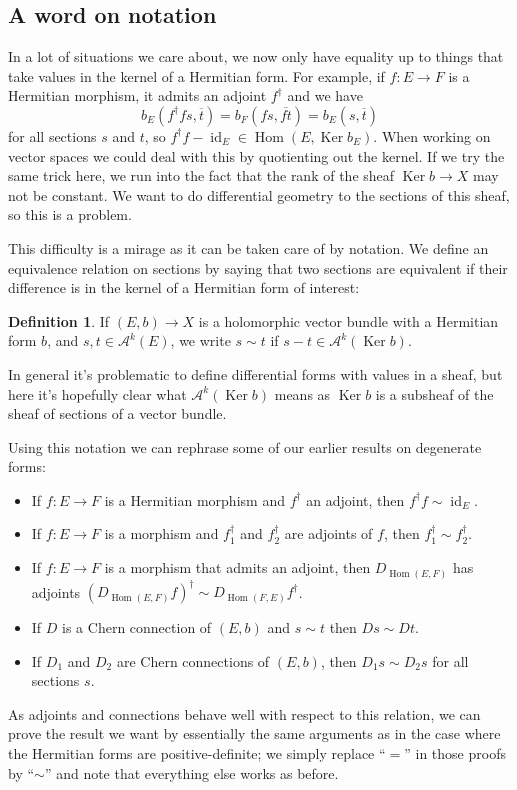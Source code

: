 \documentclass[10pt,a4paper]{amsart}
\theoremstyle{definition}
\newtheorem{defi}[theo]{Definition}
\newcommand{\cc}[1]{\mathcal{#1}}
\def\ov#1{\overline{#1}}
\DeclareMathOperator{\Ker}{Ker}
\DeclareMathOperator{\Hom}{Hom}
\DeclareMathOperator{\id}{id}
\begin{document}
\subsection*{A word on notation}


In a lot of situations we care about, we now only have equality up to things that take values in the kernel of a Hermitian form. For example, if $f : E \to F$ is a Hermitian morphism, it admits an adjoint $f^\dagger$ and we have
\[
b_E(f^\dagger f s, \ov t)
= b_F(f s, \ov{f t})
= b_E(s, \ov t)
\]
for all sections $s$ and $t$,
so $f^\dagger f - \id_E \in \Hom(E, \Ker b_E)$. When working on vector spaces we could deal with this by quotienting out the kernel. If we try the same trick here, we run into the fact that the rank of the sheaf $\Ker b \to X$ may not be constant. We want to do differential geometry to the sections of this sheaf, so this is a problem.

This difficulty is a mirage as it can be taken care of by notation. We define an equivalence relation on sections by saying that two sections are equivalent if their difference is in the kernel of a Hermitian form of interest:


\begin{defi}
If $(E, b) \to X$ is a holomorphic vector bundle with a Hermitian form $b$, and $s, t \in \cc A^k(E)$, we write
\(
s \sim t
\)
if $s - t \in \cc A^k(\Ker b)$.
\end{defi}

In general it's problematic to define differential forms with values in a sheaf, but here it's hopefully clear what $\cc A^k(\Ker b)$ means as $\Ker b$ is a subsheaf of the sheaf of sections of a vector bundle.

Using this notation we can rephrase some of our earlier results on degenerate forms:
\begin{itemize}
\item
If $f : E \to F$ is a Hermitian morphism and $f^\dagger$ an adjoint, then $f^\dagger f \sim \id_E$.

\item
If $f : E \to F$ is a morphism and $f_1^\dagger$ and $f_2^\dagger$ are adjoints of $f$, then $f_1^\dagger \sim f_2^\dagger$.

\item
If $f : E \to F$ is a morphism that admits an adjoint, then $D_{\Hom(E,F)}$ has adjoints $(D_{\Hom(E,F)}f)^\dagger \sim D_{\Hom(F,E)}f^\dagger$.

\item
If $D$ is a Chern connection of $(E,b)$ and $s \sim t$ then $Ds \sim Dt$.

\item
If $D_1$ and $D_2$ are Chern connections of $(E,b)$, then $D_1s \sim D_2s$ for all sections $s$.
\end{itemize}
As adjoints and connections behave well with respect to this relation, we can prove the result we want by essentially the same arguments as in the case where the Hermitian forms are positive-definite; we simply replace ``$=$'' in those proofs by ``$\sim$'' and note that everything else works as before.
\end{document}
